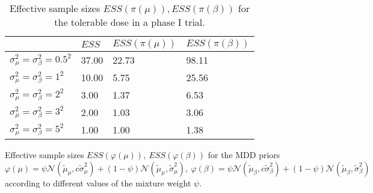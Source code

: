 \documentclass{statsoc}
\begin{document}
\begin{small}
\newpage

\begin{table}
\caption{\label{tab:03}Effective sample sizes $ESS(\pi(\mu)), ESS(\pi(\beta))$ for the tolerable dose in a phase I trial.}
\begin{tabular}{|llll|} 
\hline
& \tiny{$ ESS$} & \tiny{$ 
  ESS(\pi(\mu))$}& \tiny{$ESS(\pi(\beta))$}\\
  \hline
  $\sigma^{2}_{\mu}=\sigma^{2}_{\beta}=0.5^{2}$ & 37.00 & 22.73 & 98.11 \\
  $\sigma^{2}_{\mu}=\sigma^{2}_{\beta}=1^{2}$ & 10.00 & 5.75 & 25.56 \\
  $\sigma^{2}_{\mu}=\sigma^{2}_{\beta}=2^{2}$ & 3.00 & 1.37 & 6.53 \\
 $\sigma^{2}_{\mu}=\sigma^{2}_{\beta}=3^{2}$ & 2.00 & 1.03 & 3.06 \\
 $\sigma^{2}_{\mu}=\sigma^{2}_{\beta}=5^{2}$ & 1.00 & 1.00 & 1.38 \\
 \hline
\end{tabular}
\end{table}

   

 

\begin{table}
\caption{\label{tab:04} \small Effective sample sizes $ESS(\varphi(\mu)), \ ESS(\varphi(\beta))$ for the MDD priors $\varphi(\mu)=\psi \mathcal{N}(\tilde{\mu}_{\mu}, c\tilde{\sigma}^{2}_{\mu})+ (1-\psi)\mathcal{N}(\tilde{\mu}_{\mu}, \tilde{\sigma}^{2}_{\mu}), \ \varphi(\beta)=\psi \mathcal{N}(\tilde{\mu}_{\beta}, c\tilde{\sigma}^{2}_{\beta})+ (1-\psi)\mathcal{N}(\tilde{\mu}_{\beta}, \tilde{\sigma}^{2}_{\beta})$ according to different values of the mixture weight $\psi$.}
\begin{small}


\end{small}
\end{table}
\end{small}
\end{document}
